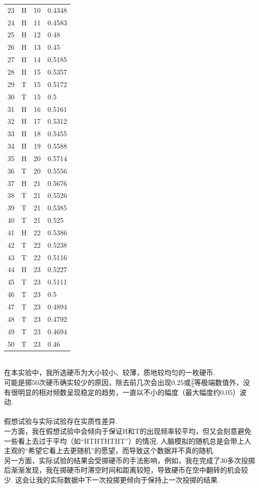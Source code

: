 \documentclass{article}
\begin{document}
\begin{CJK}{UTF8}{gbsn}
\begin{tabular}{l|l|l|l}
	23 & H & 10 & 0.4348\\
	24 & H & 11 & 0.4583\\
	25 & H & 12 & 0.48\\
	26 & H & 13 & 0.45\\
	27 & H & 14 & 0.5185\\
	28 & H & 15 & 0.5357\\
	29 & T & 15 & 0.5172\\
	30 & T & 15 & 0.5\\
	31 & H & 16 & 0.5161\\
	32 & H & 17 & 0.5312\\
	33 & H & 18 & 0.5455\\
	34 & H & 19 & 0.5588\\
	35 & H & 20 & 0.5714\\
	36 & T & 20 & 0.5556\\
	37 & H & 21 & 0.5676\\
	38 & T & 21 & 0.5526\\
	39 & T & 21 & 0.5385\\
	40 & T & 21 & 0.525\\
	41 & H & 22 & 0.5386\\
	42 & T & 22 & 0.5238\\
	43 & T & 22 & 0.5116\\
	44 & H & 23 & 0.5227\\
	45 & T & 23 & 0.5111\\
	46 & T & 23 & 0.5\\
	47 & T & 23 & 0.4894\\
	48 & T & 23 & 0.4792\\
	49 & T & 23 & 0.4694\\
	50 & T & 23 & 0.46\\
\end{tabular}
\\
在本实验中，我所选硬币为大小较小、较薄，质地较均匀的一枚硬币.
\\
可能是掷$50$次硬币确实较少的原因，除去前几次会出现$0.25$或$\frac{2}{3}$等极端数值外，没有很明显的相对频数呈现稳定的趋势，一直以不小的幅度（最大幅度约$0.05$）波动.
\\
\\
假想试验与实际试验存在实质性差异.
\\
一方面，我在假想试验中会倾向于保证H和T的出现频率较平均，但又会刻意避免一些看上去过于平均（如“HTHTHTHT”）的情况. 人脑模拟的随机总是会带上人主观的“希望它看上去更随机”的愿望，而导致这个数据并不真的随机.
\\
另一方面，实际试验的结果会受掷硬币的手法影响，例如，我在完成了30多次投掷后渐渐发现，我在掷硬币时滞空时间和距离较短，导致硬币在空中翻转的机会较少. 这会让我的实际数据中下一次投掷更倾向于保持上一次投掷的结果.

\end{CJK}
\end{document}
